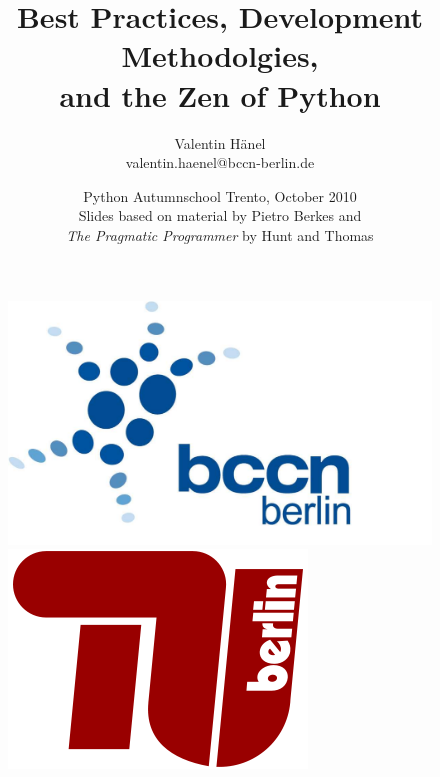 \documentclass[ hyperref={colorlinks=true,filecolor=blue,linkcolor=blue,urlcolor=blue}]{beamer}
\author{Valentin H\"anel\\
        valentin.haenel@bccn-berlin.de}
\institute{Technische Universität Berlin \\
Bernstein Center for Computational Neuroscience Berlin}
\title{Best Practices, Development Methodolgies,\\
and the Zen of Python}
\date{Python Autumnschool Trento, October 2010\\
Slides based on material by Pietro Berkes and \\
{\it The Pragmatic Programmer} by Hunt and Thomas}
\begin{document}
\begin{frame}
	\titlepage
    \begin{figure}
	    \includegraphics[scale=0.05]{BCCN_logo_berlin.pdf}
	    \includegraphics[scale=0.14]{tu_logo.png}
    \end{figure}
\end{frame}


\end{document}
